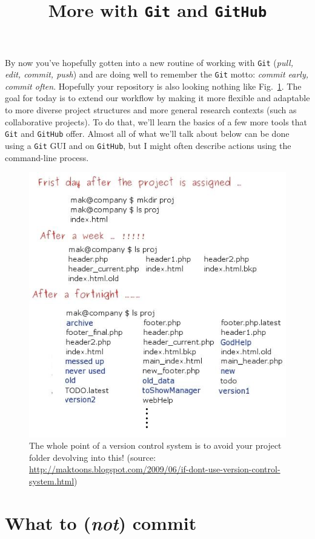 \documentclass[12pt,letterpaper]{article}
\author{}
\title{More with \texttt{Git} and \texttt{GitHub}}
\begin{document}
\maketitle

\tableofcontents

\pagebreak

By now you've hopefully gotten into a new routine of working with \texttt{Git} (\emph{pull, edit, commit, push}) and are doing well to remember the \texttt{Git} motto: \emph{commit early, commit often}.
Hopefully your repository is also looking nothing like Fig.~\ref{fig:makcvs}.
The goal for today is to extend our workflow by making it more flexible and adaptable to more diverse project structures and more general research contexts (such as collaborative projects).
To do that, we'll learn the basics of a few more tools that \texttt{Git} and \texttt{GitHub} offer.
Almost all of what we'll talk about below can be done using a \texttt{Git} GUI and on \texttt{GitHub}, but I might often describe actions using the command-line process.

\begin{figure}[h]
	\centering
	\includegraphics[width=0.8\linewidth]{figs/makcvs.png}
	\caption{The whole point of a version control system is to avoid your project folder devolving into this! (source: \url{http://maktoons.blogspot.com/2009/06/if-dont-use-version-control-system.html})}
	\label{fig:makcvs}
\end{figure}


\section{What to (\emph{not}) commit}
\end{document}
